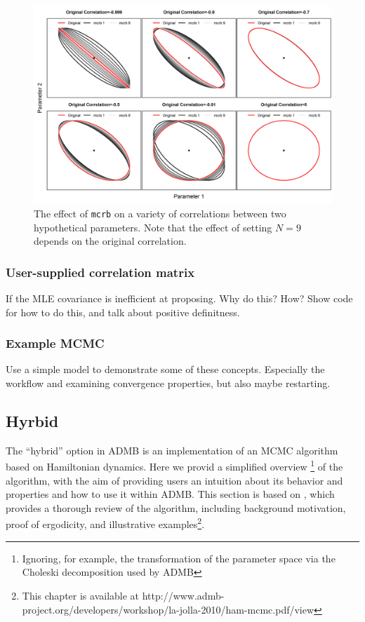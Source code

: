 \documentclass{article}\usepackage[]{graphicx}\usepackage[]{color}
\begin{document}
\begin{figure}[h]
  \centering
  \includegraphics[width=5in]{../plots/mcrb_examples.png}
  \caption{The effect of \texttt{mcrb} on a variety of
    correlations between two hypothetical parameters. Note
    that the effect of setting $N=9$ depends on the original
    correlation.}
  \label{fig:mcrb}
\end{figure}
\subsubsection{User-supplied correlation matrix}
If the MLE covariance is inefficient at proposing. Why do this?
How? Show code for how to do this, and talk about positive
definitness.
\subsubsection{Example MCMC}
Use a simple model to demonstrate some of these
concepts. Especially the workflow and examining convergence
properties, but also maybe restarting.

\subsection{Hyrbid}\label{sec:hybrid}
The ``hybrid'' option in ADMB is an implementation of an MCMC algorithm
based on Hamiltonian dynamics. Here we provid a simplified overview
\footnote{Ignoring, for example, the transformation of the parameter space
  via the Choleski decomposition used by ADMB} of the algorithm, with the
aim of providing users an intuition about its behavior and properties and
how to use it within ADMB. This section is based on \cite{brooks2011},
which provides a thorough review of the algorithm, including background
motivation, proof of ergodicity, and illustrative examples\footnote{This
  chapter is available at
  http://www.admb-project.org/developers/workshop/la-jolla-2010/ham-mcmc.pdf/view}.
\end{document}
